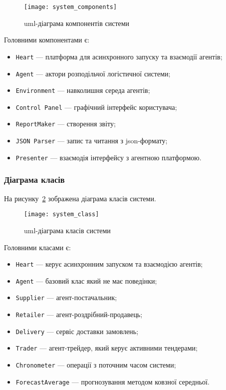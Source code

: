 \begin{figure}[H]
	\centering
	\texttt{[image: system\_components]}
	\caption{\acrshort{uml}-діаграма компонентів системи}
	\label{fig:system_component}
\end{figure} 

Головними компонентами є:
\begin{itemize}
	\item \texttt{Heart} --- платформа для асинхронного запуску та взаємодії агентів;
	\item \texttt{Agent} --- актори розподільчої логістичної системи;
	\item \texttt{Environment} --- навколишня середа агентів;
	\item \texttt{Control Panel} --- графічний інтерфейс користувача;
	\item \texttt{ReportMaker} --- створення звіту;
	\item \texttt{JSON Parser} --- запис та читання з \acrshort{json}-формату;
	\item \texttt{Presenter} --- взаємодія інтерфейсу з агентною платформою.
\end{itemize}

\subsubsection{Діаграма класів}
На рисунку~\ref{fig:system_class} зображена діаграма класів системи.

\begin{figure}[H]
	\centering
	\texttt{[image: system\_class]}
	\caption{\acrshort{uml}-діаграма класів системи}
	\label{fig:system_class}
\end{figure} 

Головними класами є:
\begin{itemize}
	\item \texttt{Heart} --- керує асинхронним запуском та взаємодією агентів;
	\item \texttt{Agent} --- базовий клас який не має поведінки;
	\item \texttt{Supplier} --- агент-постачальник;
	\item \texttt{Retailer} --- агент-роздрібний-продавець;
	\item \texttt{Delivery} --- сервіс доставки замовлень;
	\item \texttt{Trader} --- агент-трейдер, який керує активними тендерами;
	\item \texttt{Chronometer} --- операції з поточним часом системи;
	\item \texttt{ForecastAverage} --- прогнозування методом ковзної середньої.
\end{itemize}

